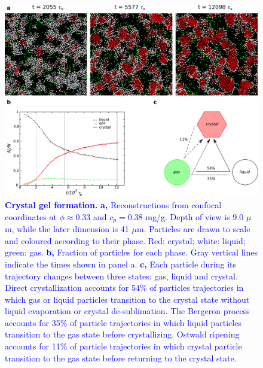 \documentclass[preprint,amsmath,amssymb,superscriptaddress]{revtex4-1}
\begin{document}
\begin{figure}[!t]
 \centering
 \includegraphics[width=14cm]{fig4}
 \caption{\textcolor{blue}{{\bf Crystal gel formation.}  
{\bf a,} Reconstructions from confocal coordinates at $\phi\approx 0.33$ and $c_p=0.38$ mg/g. Depth of view is 9.0 $\mu$m, while the later dimension is 41 $\mu$m. Particles are drawn to scale and coloured according to their phase. Red: crystal; white: liquid; green: gas.
{\bf b,} Fraction of particles for each phase. Gray vertical lines indicate the times shown in panel a. 
{\bf c,} Each particle during its trajectory changes between three states: gas, liquid and crystal. Direct crystallization accounts for 54\% of particles trajectories in which
gas or liquid particles transition to the crystal state without liquid evaporation or crystal de-sublimation. The Bergeron process accounts for 35\% of particle trajectories in which liquid particles
transition to the gas state before crystallizing. Ostwald ripening accounts for 11\% of particle trajectories in which crystal particle transition to the gas state before returning
to the crystal state.}}
\label{fig:transitions}
\end{figure}
\end{document}
